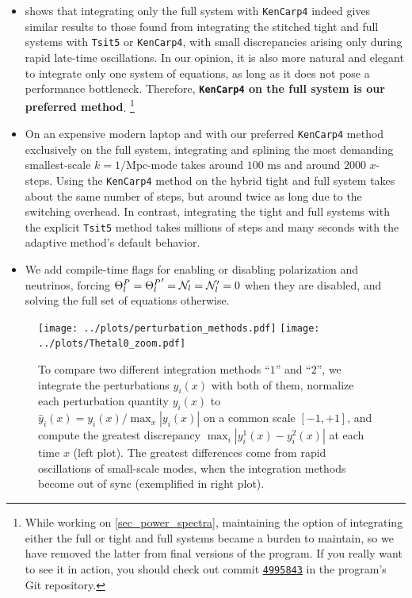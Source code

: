 \documentclass[10pt,a4paper]{article}
\begin{document}
\begin{itemize}
\item
{} shows that integrating only the full system with \texttt{KenCarp4}
indeed gives similar results to those found from integrating the stitched tight and full systems with \texttt{Tsit5} or \texttt{KenCarp4},
with small discrepancies arising only during rapid late-time oscillations.
In our opinion, it is also more natural and elegant to integrate only one system of equations,
as long as it does not pose a performance bottleneck.
Therefore, \textbf{\texttt{KenCarp4} on the full system is our preferred method}.%
\footnote{%
	While working on \cref{sec_power_spectra}, maintaining the option of integrating either the full or tight and full systems became a burden to maintain,
	so we have removed the latter from final versions of the program.
	If you really want to see it in action,
	you should check out commit \texttt{\href{https://github.com/hersle/COMBO.jl/tree/4995843ac872425bc6b1d173dd171600164b74b9}{4995843}} in the program's Git repository.
}

\item
On an expensive modern laptop and with our preferred \texttt{KenCarp4} method exclusively on the full system,
integrating and splining the most demanding smallest-scale $k=1/\textrm{Mpc}$-mode
takes around $100 \textrm{ ms}$ and around $2000$ $x$-steps.
Using the \texttt{KenCarp4} method on the hybrid tight and full system takes about the same number of steps,
but around twice as long due to the switching overhead.
In contrast, integrating the tight and full systems with the explicit \texttt{Tsit5} method takes millions of steps and many seconds with the adaptive method's default behavior.

\item
We add compile-time flags for enabling or disabling polarization and neutrinos,
forcing $\Theta^P_l = {\Theta^P_l}^\prime = \mathcal{N}_l = \mathcal{N}_l^\prime = 0$ when they are disabled,
and solving the full set of equations otherwise.
\end{itemize}

\begin{figure}
\texttt{[image: ../plots/perturbation\_methods.pdf]}
\hfill
\texttt{[image: ../plots/Thetal0\_zoom.pdf]}
\caption{To compare two different integration methods ``$1$'' and ``$2$'',
we integrate the perturbations $y_i(x)$ with both of them,
normalize each perturbation quantity $y_i(x)$ to $\hat{y}_i(x) = y_i(x) / \max_x |y_i(x)|$ on a common scale $[-1, +1]$,
and compute the greatest discrepancy $\max_i |y^1_i(x) - y^2_i(x)|$ at each time $x$ (left plot).
The greatest differences come from rapid oscillations of small-scale modes, when the integration methods become out of sync (exemplified in right plot).}
\label{fig_perturb_methods}
\end{figure}
\end{document}
